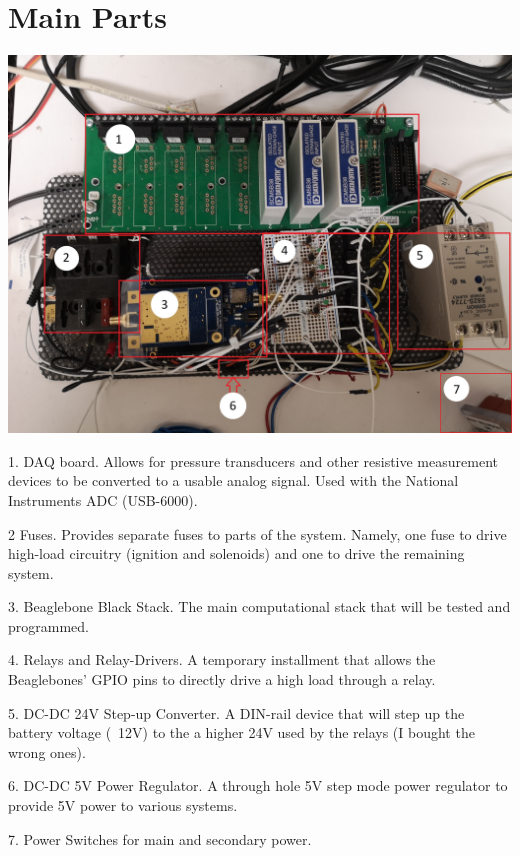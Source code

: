 \documentclass[12pt,article]{memoir}
\begin{document}
\section{Main Parts}
\includegraphics[width=7in]{EI00002_overview.jpg}

1. DAQ board. Allows for pressure transducers and other resistive measurement devices to be converted to a usable analog signal. Used with the National Instruments ADC (USB-6000).

2 Fuses. Provides separate fuses to parts of the system. Namely, one fuse to drive high-load circuitry (ignition and solenoids) and one to drive the remaining system.

3. Beaglebone Black Stack. The main computational stack that will be tested and programmed.

4. Relays and Relay-Drivers. A temporary installment that allows the Beaglebones' GPIO pins to directly drive a high load through a relay.

5. DC-DC 24V Step-up Converter. A DIN-rail device that will step up the battery voltage (~12V) to the a higher 24V used by the relays (I bought the wrong ones).

6. DC-DC 5V Power Regulator. A through hole 5V step mode power regulator to provide 5V power to various systems.

7. Power Switches for main and secondary power.
\end{document}
